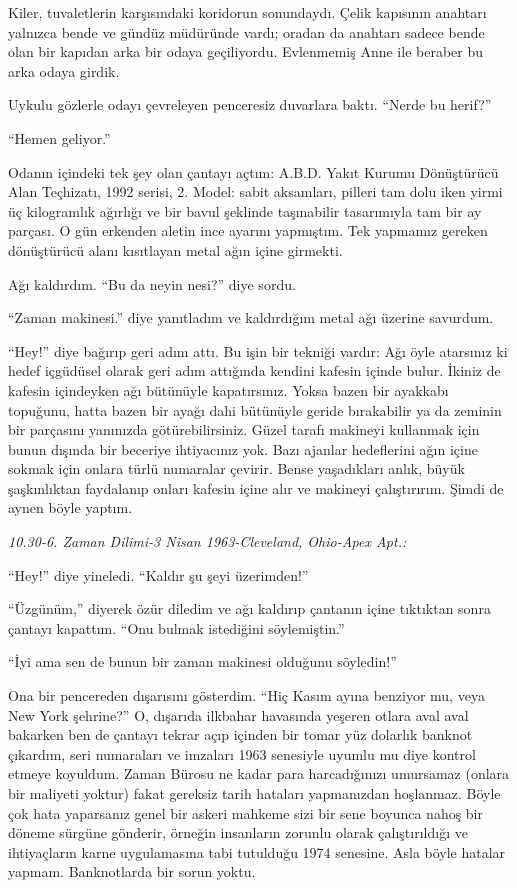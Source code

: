 Kiler, tuvaletlerin karşısındaki koridorun sonundaydı. Çelik kapısının anahtarı
yalnızca bende ve gündüz müdüründe vardı; oradan da anahtarı sadece bende olan
bir kapıdan arka bir odaya geçiliyordu. Evlenmemiş Anne ile beraber bu arka
odaya girdik.

Uykulu gözlerle odayı çevreleyen penceresiz duvarlara baktı. ``Nerde bu herif?''

``Hemen geliyor.''

Odanın içindeki tek şey olan çantayı açtım: A.B.D. Yakıt Kurumu Dönüştürücü
Alan Teçhizatı, 1992 serisi, 2. Model: sabit aksamları, pilleri tam dolu iken
yirmi üç kilogramlık ağırlığı ve bir bavul şeklinde taşınabilir tasarımıyla tam
bir ay parçası. O gün erkenden aletin ince ayarını yapmıştım. Tek yapmamız
gereken dönüştürücü alanı kısıtlayan metal ağın içine girmekti.

Ağı kaldırdım. ``Bu da neyin nesi?'' diye sordu.

``Zaman makinesi.'' diye yanıtladım ve kaldırdığım metal ağı üzerine savurdum.

``Hey!'' diye bağırıp geri adım attı. Bu işin bir tekniği vardır: Ağı öyle
atarsınız ki hedef içgüdüsel olarak geri adım attığında kendini kafesin içinde
bulur. İkiniz de kafesin içindeyken ağı bütünüyle kapatırsınız. Yoksa bazen bir
ayakkabı topuğunu, hatta bazen bir ayağı dahi bütünüyle geride bırakabilir ya da
zeminin bir parçasını yanınızda götürebilirsiniz. Güzel tarafı makineyi
kullanmak için bunun dışında bir beceriye ihtiyacınız yok. Bazı ajanlar
hedeflerini ağın içine sokmak için onlara türlü numaralar çevirir. Bense
yaşadıkları anlık, büyük şaşkınlıktan faydalanıp onları kafesin içine alır ve
makineyi çalıştırırım. Şimdi de aynen böyle yaptım.

\noindent\emph{10.30-6. Zaman Dilimi-3 Nisan 1963-Cleveland, Ohio-Apex Apt.:}

``Hey!'' diye yineledi. ``Kaldır şu şeyi üzerimden!''

``Üzgünüm,'' diyerek özür diledim ve ağı kaldırıp çantanın içine tıktıktan sonra
çantayı kapattım. ``Onu bulmak istediğini söylemiştin.''

``İyi ama sen de bunun bir zaman makinesi olduğunu söyledin!''

Ona bir pencereden dışarısını gösterdim. ``Hiç Kasım ayına benziyor mu, veya New
York şehrine?'' O, dışarıda ilkbahar havasında yeşeren otlara aval aval bakarken
ben de çantayı tekrar açıp içinden bir tomar yüz dolarlık banknot çıkardım, seri
numaraları ve imzaları 1963 senesiyle uyumlu mu diye kontrol etmeye koyuldum.
Zaman Bürosu ne kadar para harcadığınızı umursamaz (onlara bir maliyeti yoktur)
fakat gereksiz tarih hataları yapmanızdan hoşlanmaz. Böyle çok hata yaparsanız
genel bir askeri mahkeme sizi bir sene boyunca nahoş bir döneme sürgüne
gönderir, örneğin insanların zorunlu olarak çalıştırıldığı ve ihtiyaçların karne
uygulamasına tabi tutulduğu 1974 senesine. Asla böyle hatalar yapmam.
Banknotlarda bir sorun yoktu.

